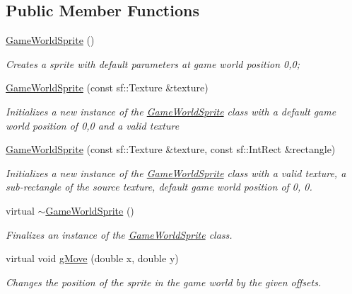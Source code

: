 \subsection*{Public Member Functions}
\begin{DoxyCompactItemize}
\item 
\hyperlink{class_game_world_sprite_abab91a4f2d92e1a1719a0a43d21ed62b}{Game\+World\+Sprite} ()
\begin{DoxyCompactList}\small\item\em Creates a sprite with default parameters at game world position 0,0; \end{DoxyCompactList}\item 
\hyperlink{class_game_world_sprite_a973f48586038da4f94a2b504c484918a}{Game\+World\+Sprite} (const sf\+::\+Texture \&texture)
\begin{DoxyCompactList}\small\item\em Initializes a new instance of the \hyperlink{class_game_world_sprite}{Game\+World\+Sprite} class with a default game world position of 0,0 and a valid texture \end{DoxyCompactList}\item 
\hyperlink{class_game_world_sprite_a99c58b4dfb012959edf78f66f994a6d5}{Game\+World\+Sprite} (const sf\+::\+Texture \&texture, const sf\+::\+Int\+Rect \&rectangle)
\begin{DoxyCompactList}\small\item\em Initializes a new instance of the \hyperlink{class_game_world_sprite}{Game\+World\+Sprite} class with a valid texture, a sub-\/rectangle of the source texture, default game world position of 0, 0. \end{DoxyCompactList}\item 
virtual \hyperlink{class_game_world_sprite_a2084d2b53b02071beaf7f1d81aa440f6}{$\sim$\+Game\+World\+Sprite} ()
\begin{DoxyCompactList}\small\item\em Finalizes an instance of the \hyperlink{class_game_world_sprite}{Game\+World\+Sprite} class. \end{DoxyCompactList}\item 
virtual void \hyperlink{class_game_world_sprite_ad2374a50582a6eb9e4da3cd2115dad08}{g\+Move} (double x, double y)
\begin{DoxyCompactList}\small\item\em Changes the position of the sprite in the game world by the given offsets. \end{DoxyCompactList}\item 

\end{DoxyCompactItemize}

